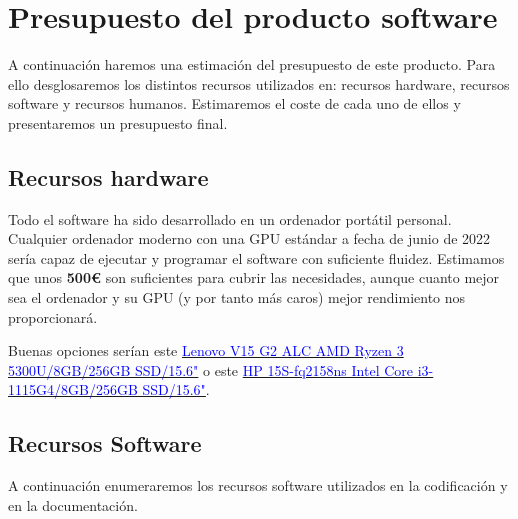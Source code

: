 \section{Presupuesto del producto software}

A continuación haremos una estimación del presupuesto de este producto. Para ello desglosaremos los distintos recursos utilizados en: recursos hardware, recursos software y recursos humanos. Estimaremos el coste de cada uno de ellos y presentaremos un presupuesto final.

\subsection{Recursos hardware}

Todo el software ha sido desarrollado en un ordenador portátil personal. Cualquier ordenador moderno con una GPU estándar a fecha de junio de 2022 sería capaz de ejecutar y programar el software con suficiente fluidez. Estimamos que unos \textbf{500\euro} son suficientes para cubrir las necesidades, aunque cuanto mejor sea el ordenador y su GPU (y por tanto más caros) mejor rendimiento nos proporcionará.

Buenas opciones serían este \href{https://www.pccomponentes.com/lenovo-v15-g2-alc-amd-ryzen-3-5300u-8gb-256gb-ssd-156}{\textcolor{blue}{Lenovo V15 G2 ALC AMD Ryzen 3 5300U/8GB/256GB SSD/15.6"}} o este \href{https://www.pccomponentes.com/hp-15s-fq2158ns-intel-core-i3-1115g4-8gb-256gb-ssd-156}{\textcolor{blue}{HP 15S-fq2158ns Intel Core i3-1115G4/8GB/256GB SSD/15.6"}}.

\subsection{Recursos Software}

A continuación enumeraremos los recursos software utilizados en la codificación y en la documentación.

